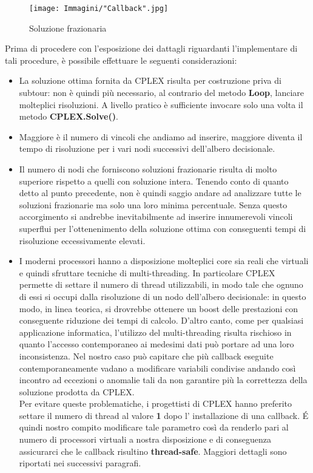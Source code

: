 \documentclass[11pt]{article}
\begin{document}
\begin{figure}[htbp]
    \centering
    \texttt{[image: Immagini/"Callback".jpg]}
    \caption{Soluzione frazionaria}
\end{figure}

Prima di procedere con l'esposizione dei dattagli riguardanti l'implementare di tali procedure, è possibile effettuare le seguenti considerazioni:\\

\begin{itemize}
    \item La soluzione ottima fornita da CPLEX risulta per costruzione priva di subtour: non è quindi più necessario, al contrario del metodo \textbf{Loop}, lanciare molteplici risoluzioni. A livello pratico è sufficiente invocare solo una volta il metodo \textbf{CPLEX.Solve()}.
    \item Maggiore è il numero di vincoli che andiamo ad inserire, maggiore diventa il tempo di risoluzione per i vari nodi successivi dell'albero decisionale.
    \item Il numero di nodi che forniscono soluzioni frazionarie risulta di molto superiore rispetto a quelli con soluzione intera. Tenendo conto di quanto detto al punto precedente, non è quindi saggio andare ad analizzare tutte le soluzioni frazionarie ma solo una loro minima percentuale. Senza questo accorgimento si andrebbe inevitabilmente ad inserire innumerevoli vincoli superflui per l'ottenenimento della soluzione ottima con conseguenti tempi di risoluzione eccessivamente elevati.
    \item I moderni processori hanno a disposizione molteplici core sia reali che virtuali e quindi sfruttare tecniche di multi-threading. In particolare CPLEX permette di settare il numero di thread utilizzabili, in modo tale che ognuno di essi si occupi dalla risoluzione di un nodo dell'albero decisionale: in questo modo, in linea teorica, si drovrebbe ottenere un boost delle prestazioni con conseguente riduzione dei tempi di calcolo. D'altro canto, come per qualsiasi applicazione informatica, l'utilizzo del multi-threading risulta rischioso in quanto l'accesso contemporaneo ai medesimi dati può portare ad una loro inconsistenza. Nel nostro caso può capitare che più callback eseguite contemporaneamente vadano a modificare variabili condivise andando così incontro ad eccezioni o anomalie tali da non garantire più la correttezza della soluzione prodotta da CPLEX.\\
    Per evitare queste problematiche, i progettisti di CPLEX hanno preferito settare il numero di thread al valore \textbf{1} dopo l' installazione di una callback. \'E quindi nostro compito modificare tale parametro così da renderlo pari al numero di processori virtuali a nostra disposizione e di conseguenza assicurarci che le callback risultino \textbf{thread-safe}. Maggiori dettagli sono riportati nei successivi paragrafi.
\end{itemize}
\end{document}
